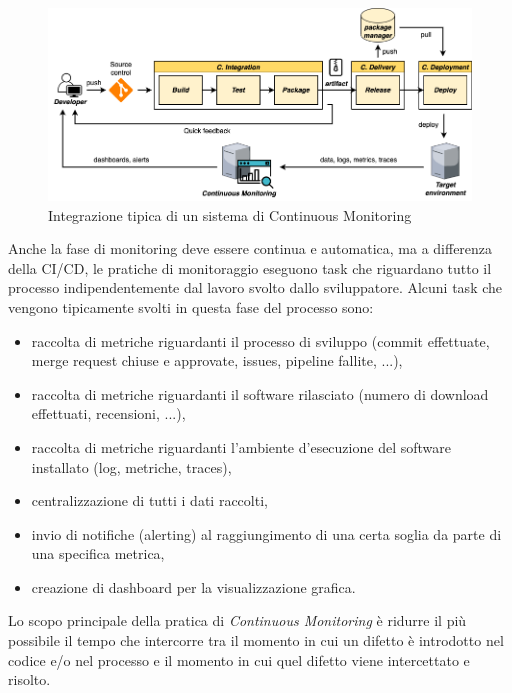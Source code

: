 \begin{figure}[H]
    \centering
    \includegraphics[width=1\textwidth]{img/ci-monitoring.png}
    \caption{Integrazione tipica di un sistema di Continuous Monitoring}
    \label{ci-monitoring}
\end{figure}

Anche la fase di monitoring deve essere continua e automatica,
ma a differenza della CI/CD, 
le pratiche di monitoraggio eseguono task che riguardano tutto il processo indipendentemente dal lavoro svolto dallo sviluppatore.
Alcuni task che vengono tipicamente svolti in questa fase del processo sono:

\begin{itemize}
    \item raccolta di metriche riguardanti il processo di sviluppo (commit effettuate, merge request chiuse e approvate, issues, pipeline fallite, ...),
    
    \item raccolta di metriche riguardanti il software rilasciato (numero di download effettuati, recensioni, ...),
    
    \item raccolta di metriche riguardanti l'ambiente d'esecuzione del software installato (log, metriche, traces),
    
    \item centralizzazione di tutti i dati raccolti,
    
    \item invio di notifiche (alerting) al raggiungimento di una certa soglia da parte di una specifica metrica,
    
    \item creazione di dashboard per la visualizzazione grafica.
\end{itemize}

Lo scopo principale della pratica di \textit{Continuous Monitoring} è ridurre il più possibile il tempo che intercorre tra il momento in cui un difetto è introdotto nel codice e/o nel processo e il momento in cui quel difetto viene intercettato e risolto.

